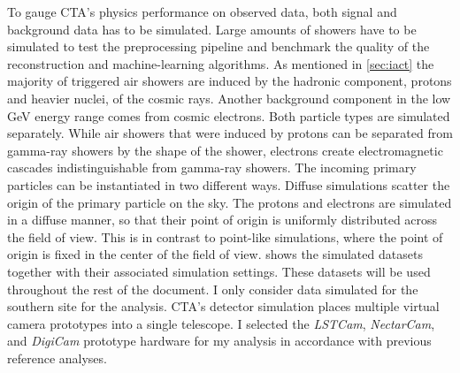 To gauge CTA's physics performance on observed data, both signal and background data has to be simulated.
Large amounts of showers have to be simulated to test the preprocessing pipeline and benchmark the quality of the reconstruction and machine-learning 
algorithms.  
As mentioned in \cref{sec:iact} the majority of triggered air showers are induced by the hadronic component, protons and heavier nuclei,  of the cosmic rays.
Another background component in the low \si{GeV} energy range comes from cosmic electrons. Both particle types are simulated separately. 
While air showers that were induced by protons can be separated from gamma-ray showers by the shape of the shower, electrons create electromagnetic cascades indistinguishable
from gamma-ray showers. 
The incoming primary particles can be instantiated in two different ways. 
Diffuse simulations scatter the origin of the primary particle on the sky. 
The protons and electrons are simulated in a diffuse manner, so that their point of origin is uniformly distributed across the field of view.
This is in contrast to point-like simulations, where the point of origin is fixed in the center of the field of view.
 shows the simulated datasets together with their associated simulation settings.
These datasets will be used throughout the rest of the document.
I only consider data simulated for the southern site for the analysis. 
CTA's detector simulation places multiple virtual camera prototypes into a single telescope.
I selected the \emph{LSTCam}, \emph{NectarCam}, and \emph{DigiCam} prototype hardware for my analysis 
in accordance with previous reference analyses.


